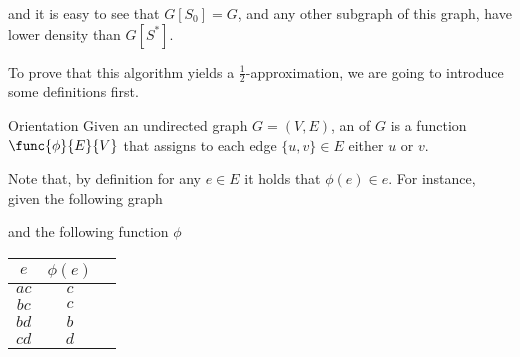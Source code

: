 \documentclass[a4paper, 12pt]{report}
\begin{document}
    and it is easy to see that $G[S_0] = G$, and any other subgraph of this graph, have lower density than $G[S^*]$.

    To prove that this algorithm yields a $\tfrac{1}{2}$-approximation, we are going to introduce some definitions first.

    \begin{frameddefn}{Orientation}
        Given an undirected graph $G = (V, E)$, an  of $G$ is a function $\func{\phi}{E}{V}$ that assigns to each edge $\{u, v\} \in E$ either $u$ or $v$.
    \end{frameddefn}

    Note that, by definition for any $e \in E$ it holds that $\phi(e) \in e$. For instance, given the following graph

    \begin{figure}[H]
        \centering
    \end{figure}

    and the following function $\phi$

    \begin{center}
        \begin{tabular}{c|c c} 
             \hline
             $e$ & $\phi(e)$ \\
             \hline\hline
             $ac$ & $c$ \\ 
             \hline
             $bc$ & $c$ \\
             \hline
             $bd$ & $b$ \\
             \hline
             $cd$ & $d$ \\
             \hline
        \end{tabular}
    \end{center}
\end{document}
